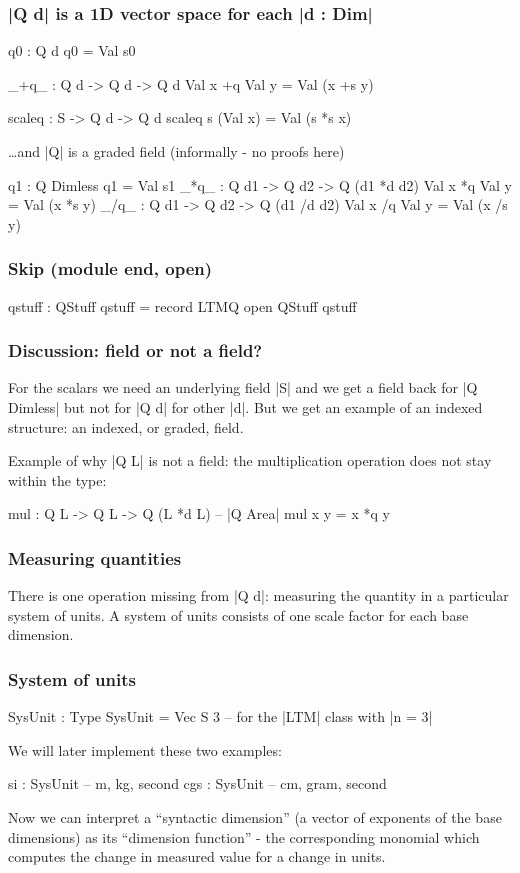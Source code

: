 \documentclass[aspectratio=169]{beamer}
\begin{document}
\begin{frame}
\frametitle{|Q d| is a 1D vector space for each |d : Dim|}
\begin{code}
    q0 : Q d
    q0 = Val s0

    _+q_ : Q d  -> Q d  -> Q d
    Val x +q Val y = Val (x +s y)

    scaleq : S -> Q d -> Q d
    scaleq s (Val x) = Val (s *s x)
\end{code}

\pause
\ldots and |Q| is a graded field (informally - no proofs here)
\begin{code}
    q1  : Q Dimless
    q1 = Val s1
    _*q_ : Q d1 -> Q d2 -> Q (d1 *d d2)
    Val x *q Val y = Val (x *s y)
    _/q_ : Q d1 -> Q d2 -> Q (d1 /d d2)
    Val x /q Val y = Val (x /s y)
\end{code}
\subsubsection{Skip (module end, open)}
\begin{code}
  qstuff : QStuff
  qstuff = record { LTMQ }
  open QStuff qstuff
\end{code}

\end{frame}
\begin{frame}
\frametitle{Discussion: field or not a field?}

For the scalars we need an underlying field |S| and we get a field
back for |Q Dimless| but not for |Q d| for other |d|. But we get an
example of an indexed structure: an indexed, or graded, field.

\pause
Example of why |Q L| is not a field: the multiplication operation
does not stay within the type:

\begin{code}
  mul : Q L -> Q L -> Q (L *d L) -- |Q Area|
  mul x y = x *q y
\end{code}

\end{frame}
\begin{frame}
\frametitle{Measuring quantities}

There is one operation missing from |Q d|: measuring the quantity in a
particular system of units. A system of units consists of one scale
factor for each base dimension.
\subsubsection{System of units}
\begin{code}
  SysUnit : Type
  SysUnit = Vec S 3   -- for the |LTM| class with |n = 3|
\end{code}
We will later implement these two examples:
\begin{spec}
  si   : SysUnit  -- m, kg, second
  cgs  : SysUnit  -- cm, gram, second
\end{spec}

Now we can interpret a ``syntactic dimension'' (a vector of exponents of
the base dimensions) as its ``dimension function'' - the corresponding
monomial which computes the change in measured value for a change in
units.
\end{frame}
\end{document}
